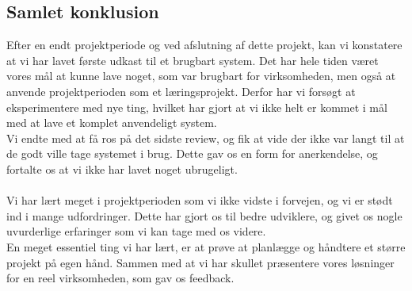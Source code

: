 \subsection{Samlet konklusion}
Efter en endt projektperiode og ved afslutning af dette projekt, kan vi konstatere at vi har lavet første udkast til et brugbart system.
Det har hele tiden været vores mål at kunne lave noget, som var brugbart for virksomheden, men også at anvende projektperioden som et læringsprojekt. Derfor har vi forsøgt at eksperimentere med nye ting, hvilket har gjort at vi ikke helt er kommet i mål med at lave et komplet anvendeligt system.
\\
Vi endte med at få ros på det sidste review, og fik at vide der ikke var langt til at de godt ville tage systemet i brug.
Dette gav os en form for anerkendelse, og fortalte os at vi ikke har lavet noget ubrugeligt.
\\\\
Vi har lært meget i projektperioden som vi ikke vidste i forvejen, og vi er stødt ind i mange udfordringer.
Dette har gjort os til bedre udviklere, og givet os nogle uvurderlige erfaringer som vi kan tage med os videre.
\\
En meget essentiel ting vi har lært, er at prøve at planlægge og håndtere et større projekt på egen hånd.
Sammen med at vi har skullet præsentere vores løsninger for en reel virksomheden, som gav os feedback.

